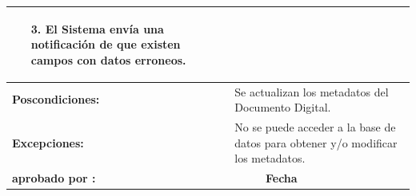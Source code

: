 \begin{center}
\begin{longtable}{|p{3cm}|p{3cm}|p{3cm}|p{3cm}|}
{\begin{itemize}
\item[3.] El Sistema envía una notificación de que existen campos con datos erroneos.
\end{itemize} 
 }\\
\hline
\bf Poscondiciones: &\multicolumn{3}{|p{9cm}|}{ Se actualizan los metadatos del Documento Digital.} \\
\hline
\bf Excepciones: &\multicolumn{3}{|p{9cm}|}{No se puede acceder a la base de datos para obtener y/o modificar los metadatos.} \\
\hline
\bf aprobado por : &   & \bf Fecha &  \\
\hline
\end{longtable}
\end{center}
% 

